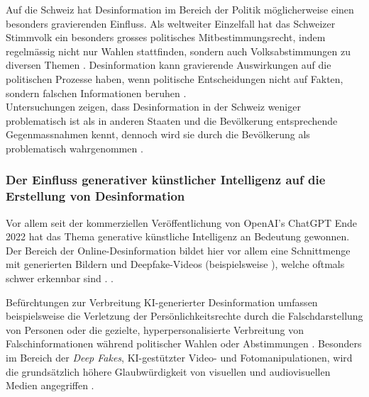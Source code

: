 \documentclass[12pt,a4paper]{article}        %
\begin{document}
Auf die Schweiz hat Desinformation im Bereich der Politik möglicherweise einen besonders gravierenden Einfluss. Als weltweiter Einzelfall hat das Schweizer Stimmvolk ein besonders grosses politisches Mitbestimmungsrecht, indem regelmässig nicht nur Wahlen stattfinden, sondern auch Volksabstimmungen zu diversen Themen \parencite[2]{sager_politische_2017}. Desinformation kann gravierende Auswirkungen auf die politischen Prozesse haben, wenn politische Entscheidungen nicht auf Fakten, sondern falschen Informationen beruhen \parencites[26]{vogler_wahrnehmung_2021}[vgl.\ auch][19]{grujic_warnhinweise_2024}.\\
Untersuchungen zeigen, dass Desinformation in der Schweiz weniger problematisch ist als in anderen Staaten und die Bevölkerung entsprechende Gegenmassnahmen kennt, dennoch wird sie durch die Bevölkerung als problematisch wahrgenommen \parencite[28-31,81]{vogler_falschinformationen_2021}.

\subsubsection{Der Einfluss generativer künstlicher Intelligenz auf die Erstellung von Desinformation}
Vor allem seit der kommerziellen Veröffentlichung von OpenAI’s ChatGPT Ende 2022 hat das Thema generative künstliche Intelligenz an Bedeutung gewonnen. Der Bereich der Online-Desinformation bildet hier vor allem eine Schnittmenge mit generierten Bildern und Deepfake-Videos (beispielsweise  \parencite[5]{birrer_what_2024}), welche oftmals schwer erkennbar sind \parencites[7]{montasari_artificial_2022}.  \parencite[4]{bontridder_role_2021}.

Befürchtungen zur Verbreitung KI-generierter Desinformation umfassen beispielsweise die Verletzung der Persönlichkeitsrechte durch die Falschdarstellung von Personen oder die gezielte, hyperpersonalisierte Verbreitung von Falschinformationen während politischer Wahlen oder Abstimmungen \parencite[56, 64f]{kertysova_artificial_2018}. Besonders im Bereich der \textit{Deep Fakes}, KI-gestützter Video- und Fotomanipulationen, wird die grundsätzlich höhere Glaubwürdigkeit von visuellen und audiovisuellen Medien angegriffen \parencite[2]{pawelec_deepfakes_2022}.
\end{document}
